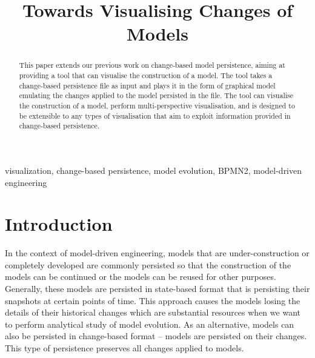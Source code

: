 \documentclass[conference]{IEEEtran}
\begin{document}
\title{Towards Visualising Changes of Models
}

\author{
}
\maketitle

\begin{abstract}
This paper extends our previous work on change-based model persistence, aiming at
providing a tool that can visualise the construction of a model. The tool 
takes a change-based persistence file as input and plays it 
in the form of graphical model emulating the changes applied to 
the model persisted in the file. 
The tool can visualise the construction of a model, 
perform multi-perspective visualisation, and
is designed to be extensible to any types of visualisation 
that aim to exploit information provided in change-based persistence.


\end{abstract}

\begin{IEEEkeywords}
visualization, change-based persistence, model evolution, BPMN2, model-driven engineering
\end{IEEEkeywords}

\section{Introduction}
\label{sec:introduction}
In the context of model-driven engineering, models that are under-construction or completely developed are commonly persisted 
so that the construction of the models can be continued or the models can be reused for other purposes. 
Generally, these models are persisted in state-based format that is persisting their snapshots at certain points of time. 
This approach causes the models losing the details of their historical changes which are substantial resources when 
we want to perform analytical study of model evolution. As an alternative, models can also be persisted in change-based format -- models are 
persisted on their changes. This type of persistence preserves all changes applied to models.
\end{document}

